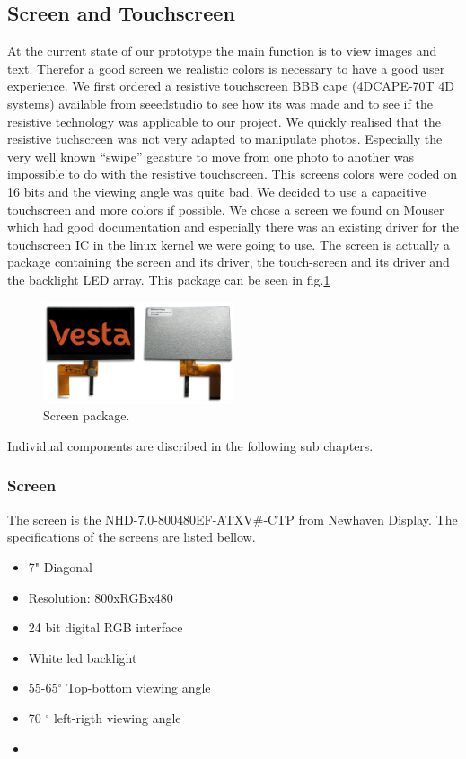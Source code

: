 \subsection{Screen and Touchscreen}
At the current state of our prototype the main function is to view images and text. Therefor a good screen we realistic colors is necessary to have a good user experience.
We first ordered a resistive touchscreen BBB cape (4DCAPE-70T 4D systems) available from seeedstudio to see how its was made and to see if the resistive technology was applicable to our project. We quickly realised that the resistive tuchscreen was not very adapted to manipulate photos. Especially the very well known “swipe” geasture to move from one photo to another was impossible to do with the resistive touchscreen.
This screens colors were coded on 16 bits and the viewing angle was quite bad. We decided to use a capacitive touchscreen and more colors if possible. We chose a screen we found on Mouser which had good documentation and especially there was an existing driver for the touchscreen IC in the linux kernel we were going to use.
 The screen is actually a package containing the screen and its driver, the touch-screen and its driver and the backlight LED array. This package can be seen in fig.\ref{fig:screen package}

 \begin{figure}[!htb]
     \centering
     \includegraphics[width=0.5\textwidth,keepaspectratio]{chap/hardFig/newhaven_screen_image}
     \caption{Screen package.}
     \label{fig:screen package}
 \end{figure}

 Individual components are discribed in the following sub chapters.

\subsubsection{Screen}
The screen is the NHD-7.0-800480EF-ATXV\#-CTP from Newhaven Display. The specifications of the screens are listed bellow.
\begin{itemize}
  \item {7" Diagonal}
  \item{Resolution: 800xRGBx480}
  \item{24 bit digital RGB interface}
  \item{White led backlight}
  \item{55-65$^{\circ}$ Top-bottom viewing angle }
  \item{70 $^{\circ}$ left-rigth viewing angle}
  \item{}
\end{itemize}


